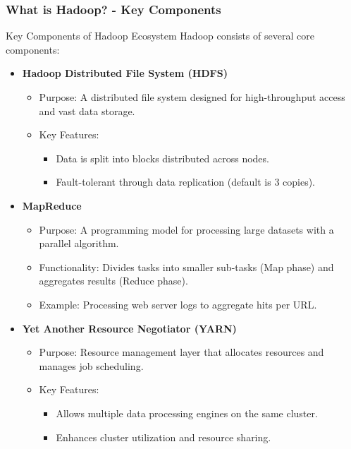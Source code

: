 \documentclass[aspectratio=169]{beamer}
\begin{document}
\begin{frame}[fragile]
    \frametitle{What is Hadoop? - Key Components}

    \begin{block}{Key Components of Hadoop Ecosystem}
        Hadoop consists of several core components:
        \begin{itemize}
            \item \textbf{Hadoop Distributed File System (HDFS)}
                \begin{itemize}
                    \item Purpose: A distributed file system designed for high-throughput access and vast data storage.
                    \item Key Features:
                        \begin{itemize}
                            \item Data is split into blocks distributed across nodes.
                            \item Fault-tolerant through data replication (default is 3 copies).
                        \end{itemize}
                \end{itemize}
                
            \item \textbf{MapReduce}
                \begin{itemize}
                    \item Purpose: A programming model for processing large datasets with a parallel algorithm.
                    \item Functionality: Divides tasks into smaller sub-tasks (Map phase) and aggregates results (Reduce phase).
                    \item Example: Processing web server logs to aggregate hits per URL.
                \end{itemize}
                
            \item \textbf{Yet Another Resource Negotiator (YARN)}
                \begin{itemize}
                    \item Purpose: Resource management layer that allocates resources and manages job scheduling.
                    \item Key Features:
                        \begin{itemize}
                            \item Allows multiple data processing engines on the same cluster.
                            \item Enhances cluster utilization and resource sharing.
                        \end{itemize}
                \end{itemize}
        \end{itemize}
    \end{block}
\end{frame}
\end{document}
